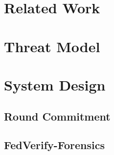 \documentclass[conference]{IEEEtran}
\begin{document}
\section{Related Work}

\section{Threat Model}

\section{System Design}
\subsection{Round Commitment}

\subsection{FedVerify-Forensics}
\end{document}
